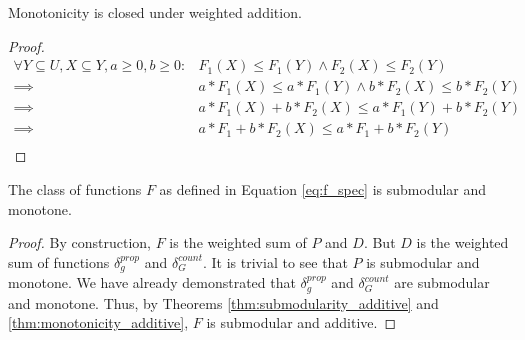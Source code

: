     \begin{theorem} 
    Monotonicity is closed under weighted addition. \label{thm:monotonicity_additive}
    \end{theorem}
    \begin{proof}
    \begin{equation}
        \label{eq:mononicity_additive}
        \begin{split}
            \forall Y \subseteq U, X \subseteq Y, a \geq 0, b \geq 0: & F_1(X)\leq F_1(Y) \land F_2(X)\leq F_2(Y) \\
            \implies & a*F_1(X)\leq a*F_1(Y) \land b*F_2(X)\leq b*F_2(Y) \\
            \implies & a*F_1(X) + b*F_2(X) \leq a*F_1(Y) + b*F_2(Y) \\
            \implies & a*F_1+b*F_2(X) \leq a*F_1+b*F_2(Y) \\ \nonumber
        \end{split}
    \end{equation}
    \end{proof}
    
    \begin{theorem} 
    The class of functions $F$ as defined in Equation \ref{eq:f_spec} is submodular and monotone.\label{thm:f_sub_mon}
    \end{theorem}
    \begin{proof}
    By construction, $F$ is the weighted sum of $P$ and $D$. But $D$ is the weighted sum of functions $\delta_g^{prop}$ and $\delta_G^{count}$.
    It is trivial to see that $P$ is submodular and monotone. We have already demonstrated that $\delta_g^{prop}$ and $\delta_G^{count}$ are submodular and monotone. Thus, by Theorems \ref{thm:submodularity_additive} and \ref{thm:monotonicity_additive}, $F$ is submodular and additive.
    \end{proof}